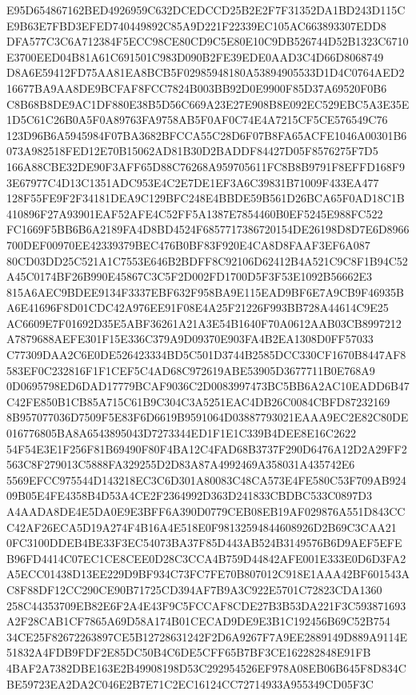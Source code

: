 \documentclass[UTF8,fontset=fandol,zihao=-4,a4paper]{ctexart}
\begin{document}
{{E95D654867162BED4926959C632DCEDCCD25B2E2F7F31352DA1BD243D115CE9B63E7FBD3EFED740449892C85A9D221F22339EC105AC663893307EDD8
DFA577C3C6A712384F5ECC98CE80CD9C5E80E10C9DB526744D52B1323C6710E3700EED04B81A61C691501C983D090B2FE39EDE0AAD3C4D66D8068749
D8A6E59412FD75AA81EA8BCB5F02985948180A53894905533D1D4C0764AED216677BA9AA8DE9BCFAF8FCC7824B003BB92D0E9900F85D37A69520F0B6
C8B68B8DE9AC1DF880E38B5D56C669A23E27E908B8E092EC529EBC5A3E35E1D5C61C26B0A5F0A89763FA9758AB5F0AF0C74E4A7215CF5CE576549C76
123D96B6A5945984F07BA3682BFCCA55C28D6F07B8FA65ACFE1046A00301B6073A982518FED12E70B15062AD81B30D2BADDF84427D05F8576275F7D5
166A88CBE32DE90F3AFF65D88C76268A959705611FC8B8B9791F8EFFD168F93E67977C4D13C1351ADC953E4C2E7DE1EF3A6C39831B71009F433EA477
128F55FE9F2F34181DEA9C129BFC248E4BBDE59B561D26BCA65F0AD18C1B410896F27A93901EAF52AFE4C52FF5A1387E7854460B0EF5245E988FC522
FC1669F5BB6B6A2189FA4D8BD4524F6857717386720154DE26198D8D7E6D8966700DEF00970EE42339379BEC476B0BF83F920E4CA8D8FAAF3EF6A087
80CD03DD25C521A1C7553E646B2BDFF8C92106D62412B4A521C9C8F1B94C52A45C0174BF26B990E45867C3C5F2D002FD1700D5F3F53E1092B56662E3
815A6AEC9BDEE9134F3337EBF632F958BA9E115EAD9BF6E7A9CB9F46935BA6E41696F8D01CDC42A976EE91F08E4A25F21226F993BB728A44614C9E25
AC6609E7F01692D35E5ABF36261A21A3E54B1640F70A0612AAB03CB8997212A7879688AEFE301F15E336C379A9D09370E903FA4B2EA1308D0FF57033
C77309DAA2C6E0DE526423334BD5C501D3744B2585DCC330CF1670B8447AF8583EF0C232816F1F1CEF5C4AD68C972619ABE53905D3677711B0E768A9
0D0695798ED6DAD17779BCAF9036C2D0083997473BC5BB6A2AC10EADD6B47C42FE850B1CB85A715C61B9C304C3A5251EAC4DB26C0084CBFD87232169
8B957077036D7509F5E83F6D6619B9591064D03887793021EAAA9EC2E82C80DE016776805BA8A6543895043D7273344ED1F1E1C339B4DEE8E16C2622
54F54E3E1F256F81B69490F80F4BA12C4FAD68B3737F290D6476A12D2A29FF2563C8F279013C5888FA329255D2D83A87A4992469A358031A435742E6
5569EFCC975544D143218EC3C6D301A80083C48CA573E4FE580C53F709AB92409B05E4FE4358B4D53A4CE2F2364992D363D241833CBDBC533C0897D3
A4AADA8DE4E5DA0E9E3BFF6A390D0779CEB08EB19AF029876A551D843CCC42AF26ECA5D19A274F4B16A4E518E0F98132594844608926D2B69C3CAA21
0FC3100DDEB4BE33F3EC54073BA37F85D443AB524B3149576B6D9AEF5EFEB96FD4414C07EC1CE8CEE0D28C3CCA4B759D44842AFE001E333E0D6D3FA2
A5ECC01438D13EE229D9BF934C73FC7FE70B807012C918E1AAA42BF601543AC8F88DF12CC290CE90B71725CD394AF7B9A3C922E5701C72823CDA1360
258C44353709EB82E6F2A4E43F9C5FCCAF8CDE27B3B53DA221F3C593871693A2F28CAB1CF7865A69D58A174B01CECAD9DE9E3B1C192456B69C52B754
34CE25F82672263897CE5B12728631242F2D6A9267F7A9EE2889149D889A9114E51832A4FDB9FDF2E85DC50B4C6DE5CFF65B7BF3CE162282848E91FB
4BAF2A7382DBE163E2B49908198D53C292954526EF978A08EB06B645F8D834CBE59723EA2DA2C046E2B7E71C2EC16124CC72714933A955349CD05F3C
}}
\end{document}
